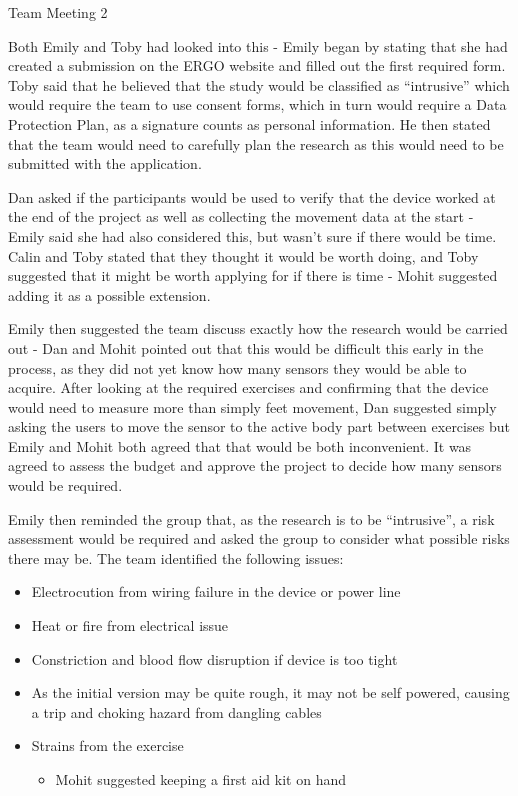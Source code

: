 \documentclass{article}
\begin{document}
\begin{Minutes}{Team Meeting 2}


Both Emily and Toby had looked into this - Emily began by stating that she had created a submission on
the ERGO website and filled out the first required form. Toby said that he believed that the study
would be classified as ``intrusive'' which would require the team to use consent forms, which in turn
would require a Data Protection Plan, as a signature counts as personal information. He then stated that
the team would need to carefully plan the research as this would need to be submitted with the application.

Dan asked if the participants would be used to verify that the device worked at the end of the project as
well as collecting the movement data at the start - Emily said she had also considered this, but wasn't
sure if there would be time. Calin and Toby stated that they thought it would be worth doing, and Toby
suggested that it might be worth applying for if there is time - Mohit suggested adding it as a possible
extension.

Emily then suggested the team discuss exactly how the research would be carried out - Dan and Mohit pointed
out that this would be difficult this early in the process, as they did not yet know how many sensors they
would be able to acquire. After looking at the required exercises and confirming that the device would need
to measure more than simply feet movement, Dan suggested simply asking the users to move the sensor to the
active body part between exercises but Emily and Mohit both agreed that that would be both inconvenient. It
was agreed to assess the budget and approve the project to decide how many sensors would be required.

Emily then reminded the group that, as the research is to be ``intrusive'', a risk assessment would be
required and asked the group to consider what possible risks there may be. The team identified the following
issues:

\begin{itemize}
	\item Electrocution from wiring failure in the device or power line
	\item Heat or fire from electrical issue
	\item Constriction and blood flow disruption if device is too tight
	\item As the initial version may be quite rough, it may not be self powered, causing a trip and choking hazard from dangling cables
	\item Strains from the exercise
		\begin{itemize}
			\item Mohit suggested keeping a first aid kit on hand
		\end{itemize}
\end{itemize}


\end{Minutes}
\end{document}
